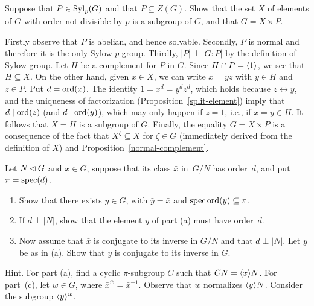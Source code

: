 \begin{probl}
    Suppose that\/ $P \in {\rm Syl}_p(G)$ and that\/ $P \subseteq Z(G)$. Show that the set\/ $X$ of elements of\/ $G$ with order not divisible by\/ $p$ is a subgroup of\/ $G$, and that\/ $G = X \times P$.
\end{probl}

\begin{solution} Firstly observe that $P$ is abelian, and hence solvable. Secondly, $P$ is normal and therefore it is the only Sylow $p$-group. Thirdly, $|P|\perp|G:P|$ by the definition of Sylow group. Let $H$ be a complement for $P$ in $G$. Since $H\cap P=\langle1\rangle$, we see that $H\subseteq X$. On the other hand, given $x\in X$, we can write $x=yz$ with $y\in H$ and $z\in P$. Put $d={\rm ord}(x)$. The identity $1=x^d=y^dz^d$, which holds because $z\leftrightarrow y$, and the uniqueness of factorization (Proposition~\ref{split-element}) imply that $d\mid{\rm ord}(z)$ (and $d\mid{\rm ord}(y)$), which may only happen if $z=1$, i.e., if $x=y\in H$. It follows that $X=H$ is a subgroup of $G$. Finally, the equality $G=X\times P$ is a consequence of the fact that $X^\zeta\subseteq X$ for $\zeta\in G$ (immediately derived from the definition of $X$) and Proposition~\ref{normal-complement}.  \end{solution}


\begin{probl}
    Let\/ $N\lhd G$ and\/ $x \in G$, suppose that its class\/ $\bar x$ in~$G/N$ has order\/~$d$, and put $\pi=\operatorname{spec}(d)$.
    \begin{enumerate}[\rm a)]
        \item Show that there exists\/ $y \in G$, with $\bar y=\bar x$ and\/ $\operatorname{spec}{\rm ord}(y)\subseteq\pi$.
        \item If\/ $d\perp|N|$, show that the element\/ $y$ of part\/ {\rm(a)} must have order\/~$d$.
        \item Now assume that\/ $\bar x$ is conjugate to its inverse in\/ $G/N$ and that\/ $d\perp|N|$. Let\/ $y$ be as in\/ {\rm (a)}. Show that\/ $y$ is conjugate to its inverse in\/ $G$.
    \end{enumerate}
    \textrm{\rm Hint. For part (a), find a cyclic\/ $\pi$-subgroup\/ $C$ such that\/ $CN = \langle x\rangle N$. For part~(c), let\/ $w \in G$, where\/ $\bar x^{\bar w} = \bar x^{-1}$. Observe that\/ $w$ normalizes $\langle y\rangle N$. Consider the subgroup $\langle y\rangle^w$.}
\end{probl}

